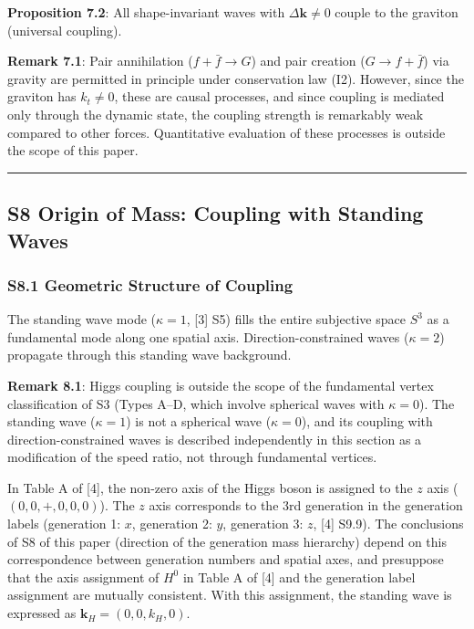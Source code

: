 \documentclass[
  a4paper,11pt]{article}
\theoremstyle{definition}
\theoremstyle{remark}
\begin{document}
\textbf{Proposition 7.2}: All shape-invariant waves with
\(\Delta\mathbf{k} \neq 0\) couple to the graviton (universal coupling).

\textbf{Remark 7.1}: Pair annihilation (\(f + \bar{f} \to G\)) and pair
creation (\(G \to f + \bar{f}\)) via gravity are permitted in principle
under conservation law (I2). However, since the graviton has
\(k_t \neq 0\), these are causal processes, and since coupling is
mediated only through the dynamic state, the coupling strength is
remarkably weak compared to other forces. Quantitative evaluation of
these processes is outside the scope of this paper.

\begin{center}\rule{0.5\linewidth}{0.5pt}\end{center}

\subsection{S8 Origin of Mass: Coupling with Standing
Waves}\label{s8-origin-of-mass-coupling-with-standing-waves}

\subsubsection{S8.1 Geometric Structure of
Coupling}\label{s8.1-geometric-structure-of-coupling}

The standing wave mode (\(\kappa = 1\), {[}3{]} S5) fills the entire
subjective space \(S^3\) as a fundamental mode along one spatial axis.
Direction-constrained waves (\(\kappa = 2\)) propagate through this
standing wave background.

\textbf{Remark 8.1}: Higgs coupling is outside the scope of the
fundamental vertex classification of S3 (Types A--D, which involve
spherical waves with \(\kappa = 0\)). The standing wave (\(\kappa = 1\))
is not a spherical wave (\(\kappa = 0\)), and its coupling with
direction-constrained waves is described independently in this section
as a modification of the speed ratio, not through fundamental vertices.

In Table A of {[}4{]}, the non-zero axis of the Higgs boson is assigned
to the \(z\) axis (\((0, 0, +, 0, 0, 0)\)). The \(z\) axis corresponds
to the 3rd generation in the generation labels (generation 1: \(x\),
generation 2: \(y\), generation 3: \(z\), {[}4{]} S9.9). The conclusions
of S8 of this paper (direction of the generation mass hierarchy) depend
on this correspondence between generation numbers and spatial axes, and
presuppose that the axis assignment of \(H^0\) in Table A of {[}4{]} and
the generation label assignment are mutually consistent. With this
assignment, the standing wave is expressed as
\(\mathbf{k}_H = (0, 0, k_H, 0)\).
\end{document}
